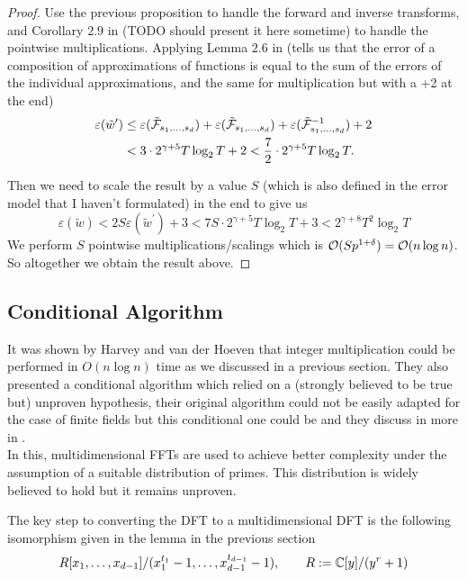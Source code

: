 \begin{proof}
    Use the previous proposition to handle the forward and inverse transforms, and Corollary $2.9$ in \cite{nlogn} (TODO should present it here sometime) to handle the pointwise multiplications. Applying Lemma $2.6$ in \cite{nlogn}(tells us that the error of a composition of approximations of functions is equal to the sum of the errors of the individual approximations, and the same for multiplication but with a +2 at the end)
    \begin{align*}
        \varepsilon(\tilde{w}^\prime) &\leq \varepsilon(\tilde{\mathcal F}_{s_1, \ldots, s_d}) + \varepsilon(\tilde{\mathcal F}_{s_1, \ldots, s_d}) + \varepsilon(\tilde{\mathcal F}^{-1}_{s_1, \ldots, s_d}) + 2\\
                                      &< 3 \cdot 2^{\gamma + 5}T\log_2 T + 2 < \frac{7}{2} \cdot 2^{\gamma + 5}T \log_2 T.
    \end{align*}

    Then we need to scale the result by a value $S$ (which is also defined in the error model that I haven't formulated) in the end to give us
    \[
        \varepsilon(\tilde{w}) < 2S\varepsilon(\tilde{w}^\prime) + 3 < 7S \cdot 2^{\gamma + 5} T \log_2 T + 3 < 2^{\gamma + 8}T^2 \log_2 T
    \]
    We perform $S$ pointwise multiplications/scalings which is $\mathcal O(Sp^{1 + \delta}) = \mathcal O(n \log n)$. So altogether we obtain the result above.
\end{proof}


\subsection{Conditional Algorithm}

It was shown by Harvey and van der Hoeven \cite{nlogn} that integer multiplication could be performed in $O(n\log n)$ time as we discussed in a previous section. They also presented a conditional algorithm which relied on a (strongly believed to be true but) unproven hypothesis, their original algorithm could not be easily adapted for the case of finite fields but this conditional one could be and they discuss in more in \cite{ffnlogn}.\\
In this, multidimensional FFTs are used to achieve better complexity under the assumption of a suitable distribution of primes. This distribution is widely believed to hold but it remains unproven.

The key step to converting the DFT to a multidimensional DFT is the following isomorphism given in the lemma in the previous section
\begin{equation}\label{eq:here}
    R[x_1, \ldots, x_{d-1}] / (x_1^{t_1} - 1, \ldots, x_{d-1}^{t_{d-1}} - 1), \qquad R := {\mathbb C}[y]/(y^r + 1)
\end{equation}

